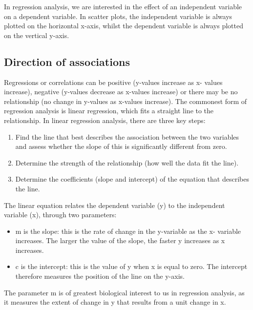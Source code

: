 \documentclass[
]{book}
\providecommand{\tightlist}{%
  \setlength{\itemsep}{0pt}\setlength{\parskip}{0pt}}
\begin{document}
In regression analysis, we are interested in the effect of an independent variable on a dependent variable. In scatter plots, the independent variable is always plotted on the horizontal x-axis, whilst the dependent variable is always plotted on the vertical y-axis.

\subsection*{Direction of associations}\label{direction-of-associations}

Regressions or correlations can be positive (y-values increase as x- values increase), negative (y-values decrease as x-values increase) or there may be no relationship (no change in y-values as x-values increase). The commonest form of regression analysis is linear regression, which fits a straight line to the relationship. In linear regression analysis, there are three key steps:

\begin{enumerate}
\def\labelenumi{\arabic{enumi})}
\tightlist
\item
  Find the line that best describes the association between the two variables and assess whether the slope of this is significantly different from zero.
\item
  Determine the strength of the relationship (how well the data fit the line).
\item
  Determine the coefficients (slope and intercept) of the equation that describes the line.
\end{enumerate}

The linear equation relates the dependent variable (y) to the independent variable (x), through two parameters:

\begin{itemize}
\tightlist
\item
  m is the slope: this is the rate of change in the y-variable as the x- variable increases. The larger the value of the slope, the faster y increases as x increases.
\item
  c is the intercept: this is the value of y when x is equal to zero. The intercept therefore measures the position of the line on the y-axis.
\end{itemize}

The parameter m is of greatest biological interest to us in regression analysis, as it measures the extent of change in y that results from a unit change in x.
\end{document}
